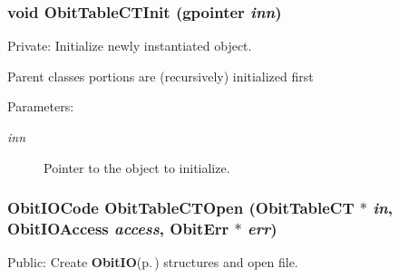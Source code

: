 \subsubsection{\setlength{\rightskip}{0pt plus 5cm}void Obit\-Table\-CTInit (gpointer {\em inn})}\label{ObitTableCT_8c_a8}


Private: Initialize newly instantiated object. 

Parent classes portions are (recursively) initialized first \begin{Desc}
\item[Parameters:]
\begin{description}
\item[{\em inn}]Pointer to the object to initialize. \end{description}
\end{Desc}
\subsubsection{\setlength{\rightskip}{0pt plus 5cm}Obit\-IOCode Obit\-Table\-CTOpen ({\bf Obit\-Table\-CT} $\ast$ {\em in}, Obit\-IOAccess {\em access}, {\bf Obit\-Err} $\ast$ {\em err})}\label{ObitTableCT_8c_a21}


Public: Create {\bf Obit\-IO}{\rm (p.\,\pageref{structObitIO})} structures and open file. 

